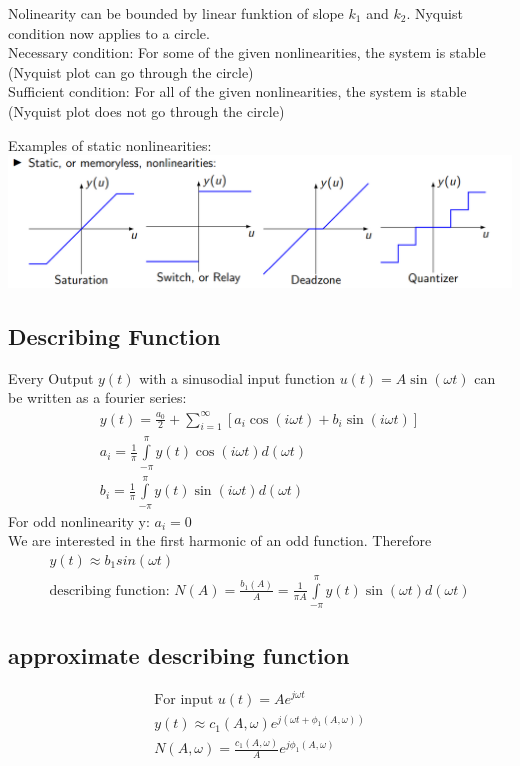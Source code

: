 Nolinearity can be bounded by linear funktion of slope $k_1$ and $k_2$. Nyquist condition now applies to a circle.\\
Necessary condition: For some of the given nonlinearities, the system is stable (Nyquist plot can go through the circle)\\
Sufficient condition: For all of the given nonlinearities, the system is stable (Nyquist plot does not go through the circle)

Examples of static nonlinearities:\\
\includegraphics[width = \linewidth]{src/images/nonlinearity_example.png}

\subsection{Describing Function}
    Every Output $y(t)$ with a sinusodial input function $u(t) = A \sin(\omega t)$ can be written as a fourier series:
    \begin{align*}
        y(t) = \frac{a_0}{2} + \sum\limits_{i = 1}^{\infty}[a_i \cos(i \omega t) + b_i \sin(i \omega t)]\\
        a_i = \frac{1}{\pi} \int\limits_{-\pi}^{\pi} y(t) \cos(i \omega t) d(\omega t)\\
        b_i = \frac{1}{\pi} \int\limits_{-\pi}^{\pi} y(t) \sin(i \omega t) d(\omega t)
    \end{align*}
    For odd nonlinearity y: $a_i = 0$\\
    We are interested in the first harmonic of an odd function. Therefore 
    \begin{align*}
        y(t) \approx b_1 sin(\omega t)\\
        \text{describing function: } N(A) = \frac{b_1(A)}{A} = \frac{1}{\pi A} \int\limits_{-\pi}^{\pi} y(t) \sin(\omega t) d(\omega t)
    \end{align*}

\subsection{approximate describing function}
    \begin{align*}
        \text{For input } u(t) = Ae^{j \omega t}\\
        y(t) \approx c_1(A, \omega) e^{j(\omega t + \phi_1(A, \omega))}\\
        N(A, \omega) = \frac{c_1(A, \omega)}{A} e^{j \phi_1(A, \omega)}
    \end{align*}

